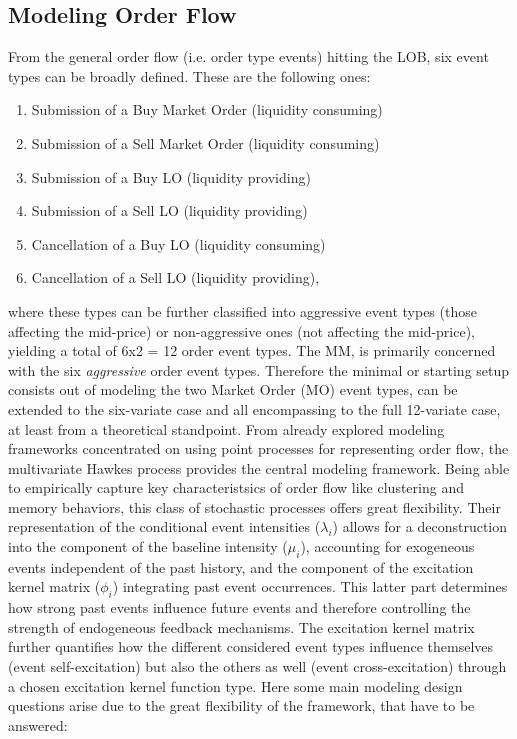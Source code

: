 \documentclass[11pt,a4paper]{cau_exec_summary}
\begin{document}
\subsection{Modeling Order Flow}
From the general order flow (i.e. order type events) hitting the LOB, six event types can be broadly defined. These are the following ones:
\begin{enumerate}
    \item Submission of a Buy Market Order (liquidity consuming)
    \item Submission of a Sell Market Order (liquidity consuming)
    \item Submission of a Buy LO (liquidity providing)
    \item Submission of a Sell LO (liquidity providing)
    \item Cancellation of a Buy LO (liquidity consuming)
    \item Cancellation of a Sell LO (liquidity providing),
\end{enumerate}
where these types can be further classified into aggressive event types (those affecting the mid-price) or non-aggressive ones (not affecting the mid-price), yielding a total of 6x2 = 12 order event types. The MM, is primarily concerned with the six \emph{aggressive} order event types. Therefore the minimal or starting setup 
consists out of modeling the two Market Order (MO) event types, can be extended to the six-variate case and all encompassing to the full 12-variate case, at least from a theoretical standpoint. From already explored modeling frameworks concentrated on 
using point processes for representing order flow, the multivariate Hawkes process provides the central modeling framework. Being able to empirically capture key characteristsics of order flow like clustering and memory behaviors, this class of stochastic processes offers great flexibility. Their representation of the conditional event intensities ($\lambda_{i}$) allows for a deconstruction into the component of the baseline intensity ($\mu_{i}$), accounting for exogeneous events independent of the past history, and the component of the excitation kernel matrix ($\phi_{i}$) integrating past event occurrences. This latter part determines how strong past events influence future events and therefore controlling the strength of endogeneous feedback mechanisms. The excitation kernel matrix further quantifies how the different considered event types influence themselves (event self-excitation) but also the others as well (event cross-excitation) through a chosen excitation kernel function type. Here some main modeling design questions arise due to the great flexibility of the framework, that have to be answered:
\end{document}
